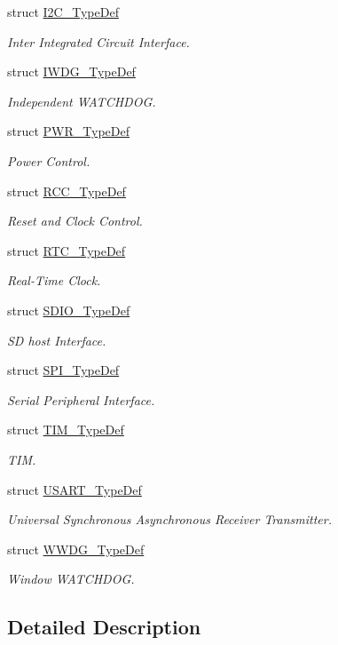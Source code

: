 \begin{DoxyCompactItemize}
struct \hyperlink{struct_i2_c___type_def}{I2\+C\+\_\+\+Type\+Def}
\begin{DoxyCompactList}\small\item\em Inter Integrated Circuit Interface. \end{DoxyCompactList}\item 
struct \hyperlink{struct_i_w_d_g___type_def}{I\+W\+D\+G\+\_\+\+Type\+Def}
\begin{DoxyCompactList}\small\item\em Independent W\+A\+T\+C\+H\+D\+OG. \end{DoxyCompactList}\item 
struct \hyperlink{struct_p_w_r___type_def}{P\+W\+R\+\_\+\+Type\+Def}
\begin{DoxyCompactList}\small\item\em Power Control. \end{DoxyCompactList}\item 
struct \hyperlink{struct_r_c_c___type_def}{R\+C\+C\+\_\+\+Type\+Def}
\begin{DoxyCompactList}\small\item\em Reset and Clock Control. \end{DoxyCompactList}\item 
struct \hyperlink{struct_r_t_c___type_def}{R\+T\+C\+\_\+\+Type\+Def}
\begin{DoxyCompactList}\small\item\em Real-\/\+Time Clock. \end{DoxyCompactList}\item 
struct \hyperlink{struct_s_d_i_o___type_def}{S\+D\+I\+O\+\_\+\+Type\+Def}
\begin{DoxyCompactList}\small\item\em SD host Interface. \end{DoxyCompactList}\item 
struct \hyperlink{struct_s_p_i___type_def}{S\+P\+I\+\_\+\+Type\+Def}
\begin{DoxyCompactList}\small\item\em Serial Peripheral Interface. \end{DoxyCompactList}\item 
struct \hyperlink{struct_t_i_m___type_def}{T\+I\+M\+\_\+\+Type\+Def}
\begin{DoxyCompactList}\small\item\em T\+IM. \end{DoxyCompactList}\item 
struct \hyperlink{struct_u_s_a_r_t___type_def}{U\+S\+A\+R\+T\+\_\+\+Type\+Def}
\begin{DoxyCompactList}\small\item\em Universal Synchronous Asynchronous Receiver Transmitter. \end{DoxyCompactList}\item 
struct \hyperlink{struct_w_w_d_g___type_def}{W\+W\+D\+G\+\_\+\+Type\+Def}
\begin{DoxyCompactList}\small\item\em Window W\+A\+T\+C\+H\+D\+OG. \end{DoxyCompactList}\end{DoxyCompactItemize}


\subsection{Detailed Description}
